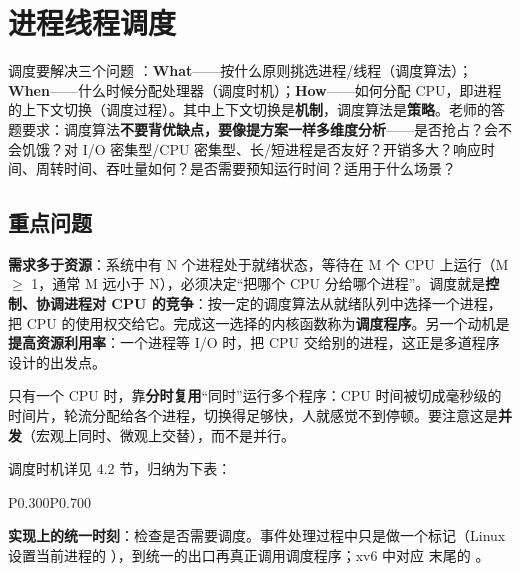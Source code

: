 \section{进程线程调度}

调度要解决三个问题 \bk：\textbf{What}——按什么原则挑选进程/线程（调度算法）；\textbf{When}——什么时候分配处理器（调度时机）；\textbf{How}——如何分配 CPU，即进程的上下文切换（调度过程）。其中上下文切换是\textbf{机制}，调度算法是\textbf{策略}。老师的答题要求：调度算法\textbf{不要背优缺点，要像提方案一样多维度分析}——是否抢占？会不会饥饿？对 I/O 密集型/CPU 密集型、长/短进程是否友好？开销多大？响应时间、周转时间、吞吐量如何？是否需要预知运行时间？适用于什么场景？

\subsection{重点问题}

\textbf{需求多于资源}：系统中有 N 个进程处于就绪状态，等待在 M 个 CPU 上运行（M $\ge$ 1，通常 M 远小于 N），必须决定“把哪个 CPU 分给哪个进程”。调度就是\textbf{控制、协调进程对 CPU 的竞争}：按一定的调度算法从就绪队列中选择一个进程，把 CPU 的使用权交给它。完成这一选择的内核函数称为\textbf{调度程序}。另一个动机是\textbf{提高资源利用率}：一个进程等 I/O 时，把 CPU 交给别的进程，这正是多道程序设计的出发点。

只有一个 CPU 时，靠\textbf{分时复用}“同时”运行多个程序：CPU 时间被切成毫秒级的时间片，轮流分配给各个进程，切换得足够快，人就感觉不到停顿。要注意这是\textbf{并发}（宏观上同时、微观上交替），而不是并行。

调度时机详见 4.2 节，归纳为下表：\par
\begin{btab}{P{0.300}P{0.700}}
\end{btab}
\textbf{实现上的统一时刻}：检查是否需要调度。事件处理过程中只是做一个标记（Linux 设置当前进程的 ），到统一的出口再真正调用调度程序；xv6 中对应  末尾的 。


